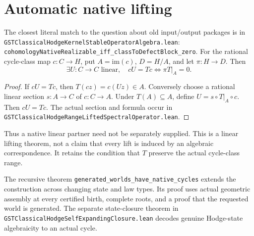 \documentclass[11pt]{article}
\newcommand{\im}{\mathrm{im}}
\begin{document}
\section{Automatic native lifting}
The closest literal match to the question about old input/output
packages is in
\texttt{GSTClassicalHodgeKernelStableOperatorAlgebra.lean}:
\texttt{cohomologyNativeRealizable\_iff\_classToDefectBlock\_zero}.
For the rational cycle-class map $c:C\to H$, put
$A=\im(c)$, $D=H/A$, and let $\pi:H\to D$. Then
\[
 \boxed{\exists U:C\to C\text{ linear},\quad cU=Tc
             \iff \pi T|_A=0.}                               \tag{4}
\]
\begin{proof}
If $cU=Tc$, then $T(cz)=c(Uz)\in A$.
Conversely choose a rational linear section $s:A\to C$
of $c:C\to A$. Under $T(A)\subseteq A$, define
$U=s\circ T|_A\circ c$. Then $cU=Tc$.
The actual section and formula occur in
\texttt{GSTClassicalHodgeRangeLiftedSpectralOperator.lean}.
\end{proof}
Thus a native linear partner need not be separately supplied.
This is a linear lifting theorem, not a claim that every lift
is induced by an algebraic correspondence. It retains the
condition that $T$ preserve the actual cycle-class range.

The recursive theorem
\texttt{generated\_worlds\_have\_native\_cycles} extends the
construction across changing state and law types. Its proof
uses actual geometric assembly at every certified birth,
complete roots, and a proof that the requested world is generated.
The separate state-closure theorem in
\texttt{GSTClassicalHodgeSelfExpandingClosure.lean} decodes
genuine Hodge-state algebraicity to an actual cycle.
\end{document}

